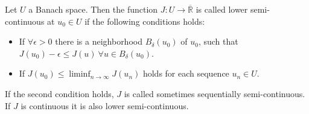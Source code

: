 \begin{definition}
	Let $U$ a Banach space. Then the function $J:U\rightarrow \overline{\mathbb{R}}$ is called lower semi-continuous at $u_0 \in U$ if the following conditions holds:
	\begin{itemize}
		\item If $\forall \epsilon > 0$ there is a neighborhood $B_\delta (u_0)$ of $u_0$, such that $J(u_0)-\epsilon \leq J(u) \ \forall u \in B_\delta(u_0)$.
		\item If $J(u_0)\leq\liminf_{n\rightarrow \infty} J(u_n)$ holds for each sequence $u_n \in U$.
	\end{itemize}
\end{definition}

\begin{remark}
	If the second condition holds, $J$ is called sometimes sequentially semi-continuous. If $J$ is continuous it is also lower semi-continuous.
\end{remark}
